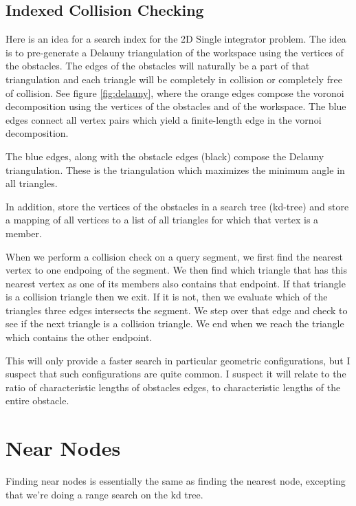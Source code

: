 \subsection{Indexed Collision Checking}

Here is an idea for a search index for the 2D Single integrator problem. The idea is to pre-generate a Delauny triangulation of the workspace using the vertices of the obstacles. The edges of the obstacles will naturally be a part of that triangulation and each triangle will be completely in collision or completely free of collision. See figure \ref{fig:delauny}, where the orange edges compose the voronoi decomposition using the vertices of the obstacles and of the workspace. The blue edges connect all vertex pairs which yield a finite-length edge in the vornoi decomposition.  

\begin{figure}[H]
\begin{centering}
    \texttt{[image: \\figfile\{fig/delauny\_collision]}}
    \caption{Delauny Triangulation}
    \label{fig:delauny}
\end{centering} 
\end{figure}

The blue edges, along with the obstacle edges (black) compose the Delauny triangulation. These is the triangulation which maximizes the minimum angle in all triangles. 

In addition, store the vertices of the obstacles in a search tree (kd-tree) and store a mapping of all vertices to a list of all triangles for which that vertex is a member. 

When we perform a collision check on a query segment, we first find the nearest vertex to one endpoing of the segment. We then find which triangle that has this nearest vertex as one of its members also contains that endpoint. If that triangle is a collision triangle then we exit. If it is not, then we evaluate which of the triangles three edges intersects the segment. We step over that edge and check to see if the next triangle is a collision triangle. We end when we reach the triangle which contains the other endpoint. 

This will only provide a faster search in particular geometric configurations, but I suspect that such configurations are quite common. I suspect it will relate to the ratio of characteristic lengths of obstacles edges, to characteristic lengths of the entire obstacle. 
 

\section{Near Nodes}
\label{a:NearNodes}
Finding near nodes is essentially the same as finding the nearest node, excepting that we're doing a range search on the kd tree. 

